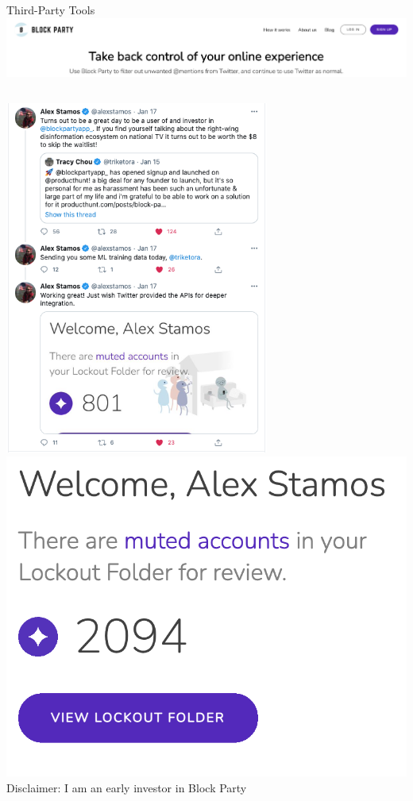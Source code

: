 \documentclass[nobackground,dvipsnames,table,aspectratio=169]{beamer}
\begin{document}
\begin{frame}{Third-Party Tools}
    \includegraphics[width=\textwidth]{block-party}
    \begin{columns}[T]
            \includegraphics[width=0.65\textwidth]{block-party-stamos-tweets}
            \includegraphics[width=\textwidth]{block-party-2}
            Disclaimer: I am an early investor in Block Party
    \end{columns}
\end{frame}
\end{document}

